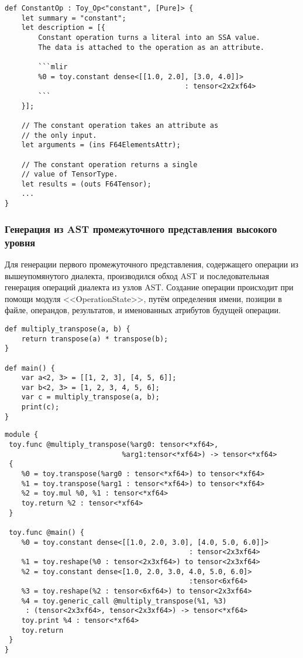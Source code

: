 \begin{lstlisting}[caption={Определение при помощи TableGen операции toy.constant.}, frame=single]
def ConstantOp : Toy_Op<"constant", [Pure]> {
    let summary = "constant";
    let description = [{
        Constant operation turns a literal into an SSA value.
        The data is attached to the operation as an attribute.

        ```mlir
        %0 = toy.constant dense<[[1.0, 2.0], [3.0, 4.0]]>
                                           : tensor<2x2xf64>
        ```
    }];

    // The constant operation takes an attribute as
    // the only input.
    let arguments = (ins F64ElementsAttr);

    // The constant operation returns a single
    // value of TensorType.
    let results = (outs F64Tensor);
    ...
}
\end{lstlisting}

\subsubsection{Генерация из AST промежуточного представления высокого уровня}

Для генерации первого промежуточного представления, содержащего операции из вышеупомянутого диалекта, производился обход AST и последовательная генерация операций диалекта из узлов AST. Создание операции происходит при помощи модуля <<OperationState>>, путём определения имени, позиции в файле, операндов, результатов, и именованных атрибутов будущей операции.

\begin{lstlisting}[caption={Пример программы на мини языке программирования.}, frame=single, label={toy_ex}]
def multiply_transpose(a, b) {
    return transpose(a) * transpose(b);
}

def main() {
    var a<2, 3> = [[1, 2, 3], [4, 5, 6]];
    var b<2, 3> = [1, 2, 3, 4, 5, 6];
    var c = multiply_transpose(a, b);
    print(c);
}
\end{lstlisting}

\begin{lstlisting}[caption={Сгенерированное промежуточное представление высокого уровня для программы листинга \ref{toy_ex}.}, frame=single, label={toy_ir}]
module {
 toy.func @multiply_transpose(%arg0: tensor<*xf64>,
                            %arg1:tensor<*xf64>) -> tensor<*xf64>
 {
    %0 = toy.transpose(%arg0 : tensor<*xf64>) to tensor<*xf64>
    %1 = toy.transpose(%arg1 : tensor<*xf64>) to tensor<*xf64>
    %2 = toy.mul %0, %1 : tensor<*xf64>
    toy.return %2 : tensor<*xf64>
 }

 toy.func @main() {
    %0 = toy.constant dense<[[1.0, 2.0, 3.0], [4.0, 5.0, 6.0]]>
                                            : tensor<2x3xf64>
    %1 = toy.reshape(%0 : tensor<2x3xf64>) to tensor<2x3xf64>
    %2 = toy.constant dense<[1.0, 2.0, 3.0, 4.0, 5.0, 6.0]>
                                            :tensor<6xf64>
    %3 = toy.reshape(%2 : tensor<6xf64>) to tensor<2x3xf64>
    %4 = toy.generic_call @multiply_transpose(%1, %3)
     : (tensor<2x3xf64>, tensor<2x3xf64>) -> tensor<*xf64>
    toy.print %4 : tensor<*xf64>
    toy.return
 }
}
\end{lstlisting}

